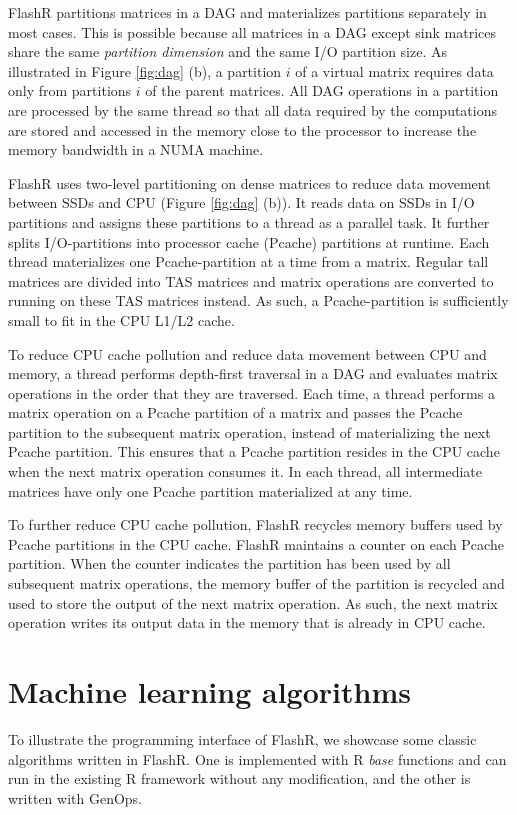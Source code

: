 FlashR partitions matrices in a DAG and materializes partitions separately in
most cases. This is possible because all matrices in a DAG except sink matrices
share the same \textit{partition dimension} and the same I/O partition size.
As illustrated in Figure \ref{fig:dag} (b), a partition $i$ of a virtual
matrix requires data only from partitions
$i$ of the parent matrices.  All DAG operations in a partition are processed by 
the same thread so that all data required by the computations are stored and
accessed in the memory close to the processor to increase the memory bandwidth
in a NUMA machine.

FlashR uses two-level partitioning on dense matrices to reduce data movement
between SSDs and CPU (Figure \ref{fig:dag} (b)). It reads data on SSDs in
I/O partitions and assigns these partitions to a thread as a parallel task.
It further splits I/O-partitions into processor cache (Pcache) partitions
at runtime.  Each thread materializes one Pcache-partition at a time from
a matrix. Regular tall matrices are divided into TAS matrices and matrix
operations are converted to running on these TAS matrices instead. As such,
a Pcache-partition is sufficiently small to fit in the CPU L1/L2 cache.

To reduce CPU cache pollution and reduce data movement between CPU and memory,
a thread performs depth-first traversal in a DAG and evaluates matrix operations
in the order that they are traversed. Each time, a thread performs a matrix
operation on a Pcache partition of a matrix and passes the Pcache partition to
the subsequent matrix operation, instead of materializing the next Pcache partition.
This ensures that a Pcache partition resides in the CPU cache when the next
matrix operation consumes it. In each thread, all intermediate matrices have
only one Pcache partition materialized at any time.

To further reduce CPU cache pollution, FlashR recycles memory buffers used
by Pcache partitions in the CPU cache. FlashR maintains a counter on each
Pcache partition. When the counter indicates the partition has been used
by all subsequent matrix operations, the memory buffer of the partition is
recycled and used to store the output of
the next matrix operation. As such, the next matrix operation writes
its output data in the memory that is already in CPU cache.

\section{Machine learning algorithms} \label{sec:apps}
To illustrate the programming interface of FlashR, we showcase some classic
algorithms written in FlashR. One is implemented with R \textit{base} functions
and can run in the existing R framework without any modification, and the other
is written with GenOps.

